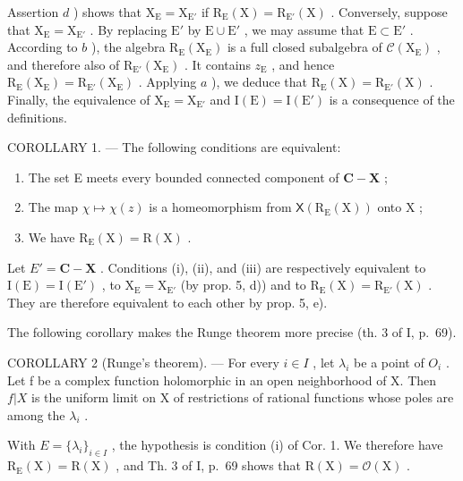 Assertion \(d\) ) shows that \(\mathrm{X}_{\mathrm{E}} = \mathrm{X}_{\mathrm{E}'}\) if \(\mathrm{R}_{\mathrm{E}}(\mathrm{X}) = \mathrm{R}_{\mathrm{E}'}(\mathrm{X})\) . Conversely, suppose that \(\mathrm{X}_{\mathrm{E}} = \mathrm{X}_{\mathrm{E}'}\) . By replacing \(\mathrm{E}'\) by \(\mathrm{E} \cup \mathrm{E}'\) , we may assume that \(\mathrm{E} \subset \mathrm{E}'\) . According to \(b\) ), the algebra \(\mathrm{R}_{\mathrm{E}}(\mathrm{X}_{\mathrm{E}})\) is a full closed subalgebra of \(\mathcal{C}(\mathrm{X}_{\mathrm{E}})\) , and therefore also of \(\mathrm{R}_{\mathrm{E}'}(\mathrm{X}_{\mathrm{E}})\) . It contains \(z_{\mathrm{E}}\) , and hence \(\mathrm{R}_{\mathrm{E}}(\mathrm{X}_{\mathrm{E}}) = \mathrm{R}_{\mathrm{E}'}(\mathrm{X}_{\mathrm{E}})\) . Applying \(a\) ), we deduce that \(\mathrm{R}_{\mathrm{E}}(\mathrm{X}) = \mathrm{R}_{\mathrm{E}'}(\mathrm{X})\) . Finally, the equivalence of \(\mathrm{X}_{\mathrm{E}} = \mathrm{X}_{\mathrm{E}'}\) and \(\mathrm{I}(\mathrm{E}) = \mathrm{I}(\mathrm{E}')\) is a consequence of the definitions.

COROLLARY 1. --- The following conditions are equivalent:

\begin{enumerate}
\def\labelenumi{(\roman{enumi})}
\item
  The set E meets every bounded connected component of \(\mathbf{C} - \mathbf{X}\) ;
\item
  The map \(\chi \mapsto \chi (z)\) is a homeomorphism from \(\mathsf{X}(\mathrm{R}_{\mathrm{E}}(\mathrm{X}))\) onto \(\mathrm{X}\) ;
\item
  We have \(\mathrm{R_E(X)} = \mathrm{R(X)}\) .
\end{enumerate}

Let \(E' = \mathbf{C} - \mathbf{X}\) . Conditions (i), (ii), and (iii) are respectively equivalent to \(\mathrm{I}(\mathrm{E}) = \mathrm{I}(\mathrm{E}')\) , to \(\mathrm{X}_{\mathrm{E}} = \mathrm{X}_{\mathrm{E}'}\) (by prop. 5, d)) and to \(\mathrm{R}_{\mathrm{E}}(\mathrm{X}) = \mathrm{R}_{\mathrm{E}'}(\mathrm{X})\) . They are therefore equivalent to each other by prop. 5, e).

The following corollary makes the Runge theorem more precise (th. 3 of I, p.~69).

COROLLARY 2 (Runge's theorem). --- For every \(i \in I\) , let \(\lambda_{i}\) be a point of \(O_{i}\) . Let f be a complex function holomorphic in an open neighborhood of X. Then \(f|X\) is the uniform limit on X of restrictions of rational functions whose poles are among the \(\lambda_{i}\) .

With \(E = \{\lambda_{i}\}_{i \in I}\) , the hypothesis is condition (i) of Cor. 1. We therefore have \(\mathrm{R}_{\mathrm{E}}(\mathrm{X}) = \mathrm{R}(\mathrm{X})\) , and Th. 3 of I, p.~69 shows that \(\mathrm{R}(\mathrm{X}) = \mathcal{O}(\mathrm{X})\) .

